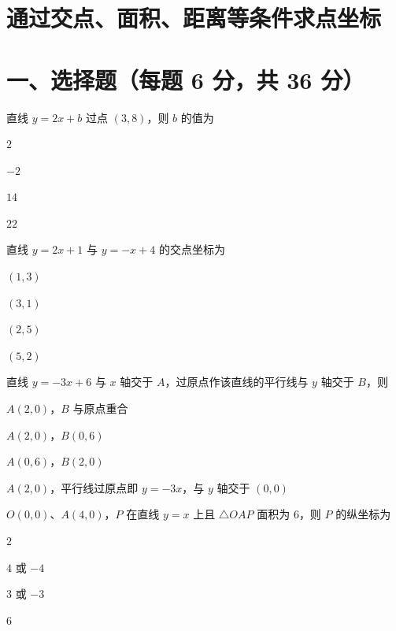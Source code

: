 \documentclass{exam-zh}
\begin{document}
\section*{通过交点、面积、距离等条件求点坐标}

\section*{一、选择题（每题 6 分，共 36 分）}



\begin{question}[points=6]
  直线 $y=2x+b$ 过点 $(3,8)$，则 $b$ 的值为
  \begin{choices}
    \item $2$
    \item $-2$
    \item $14$
    \item $22$
  \end{choices}
  \paren[A]
\end{question}



\begin{question}[points=6]
  直线 $y=2x+1$ 与 $y=-x+4$ 的交点坐标为
  \begin{choices}
    \item $(1, 3)$
    \item $(3, 1)$
    \item $(2, 5)$
    \item $(5, 2)$
  \end{choices}
  \paren[A]
\end{question}



\begin{question}[points=6]
  直线 $y=-3x+6$ 与 $x$ 轴交于 $A$，过原点作该直线的平行线与 $y$ 轴交于 $B$，则
  \begin{choices}
    \item $A(2,0)$，$B$ 与原点重合
    \item $A(2,0)$，$B(0,6)$
    \item $A(0,6)$，$B(2,0)$
    \item $A(2,0)$，平行线过原点即 $y=-3x$，与 $y$ 轴交于 $(0,0)$
  \end{choices}
  \paren[D]
\end{question}



\begin{question}[points=6]
  $O(0,0)$、$A(4,0)$，$P$ 在直线 $y=x$ 上且 $\triangle OAP$ 面积为 $6$，则 $P$ 的纵坐标为
  \begin{choices}
    \item $2$
    \item $4$ 或 $-4$
    \item $3$ 或 $-3$
    \item $6$
  \end{choices}
  \paren[C]
\end{question}
\end{document}

